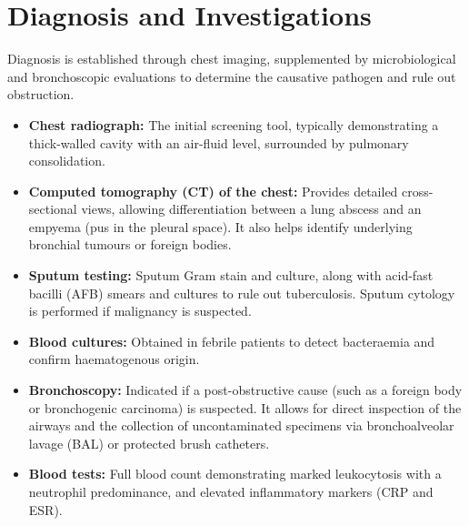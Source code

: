 \section*{Diagnosis and Investigations}
Diagnosis is established through chest imaging, supplemented by microbiological and bronchoscopic evaluations to determine the causative pathogen and rule out obstruction.
\begin{itemize}
    \item \textbf{Chest radiograph:} The initial screening tool, typically demonstrating a thick-walled cavity with an air-fluid level, surrounded by pulmonary consolidation.
    \item \textbf{Computed tomography (CT) of the chest:} Provides detailed cross-sectional views, allowing differentiation between a lung abscess and an empyema (pus in the pleural space). It also helps identify underlying bronchial tumours or foreign bodies.
    \item \textbf{Sputum testing:} Sputum Gram stain and culture, along with acid-fast bacilli (AFB) smears and cultures to rule out tuberculosis. Sputum cytology is performed if malignancy is suspected.
    \item \textbf{Blood cultures:} Obtained in febrile patients to detect bacteraemia and confirm haematogenous origin.
    \item \textbf{Bronchoscopy:} Indicated if a post-obstructive cause (such as a foreign body or bronchogenic carcinoma) is suspected. It allows for direct inspection of the airways and the collection of uncontaminated specimens via bronchoalveolar lavage (BAL) or protected brush catheters.
    \item \textbf{Blood tests:} Full blood count demonstrating marked leukocytosis with a neutrophil predominance, and elevated inflammatory markers (CRP and ESR).
\end{itemize}


